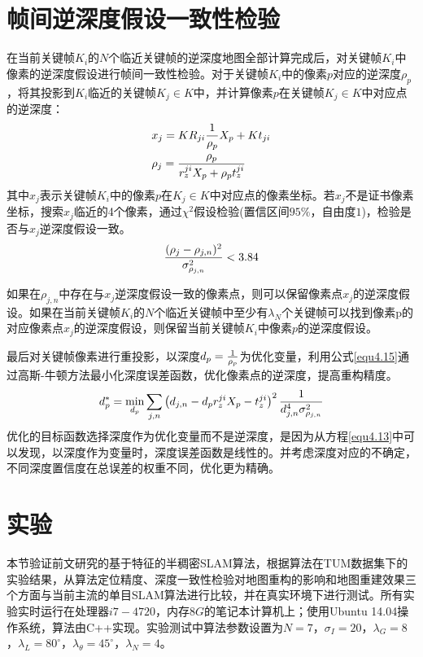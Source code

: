 \section{帧间逆深度假设一致性检验}
在当前关键帧$K_i$的$N$个临近关键帧的逆深度地图全部计算完成后，对关键帧$K_i$中像素的逆深度假设进行帧间一致性检验。对于关键帧$K_i$中的像素$p$对应的逆深度$\rho_p$，将其投影到$K_i$临近的关键帧$K_j \in K$中，并计算像素$p$在关键帧$K_j \in K$中对应点的逆深度：
\begin{equation}
\label{equ4.13}
\begin{aligned}
& x_j = K R_{ji} {1 \over \rho_p} X_p + Kt_{ji} \\ 
& \rho_j = { \rho_p \over r_z^{ji}X_p+\rho_p t_z^{ji} }
\end{aligned}
\end{equation}
其中$x_{j}$表示关键帧$K_i$中的像素$p$在$K_j \in K$中对应点的像素坐标。若$x_j$不是证书像素坐标，搜索$x_{j}$临近的4个像素，通过$\chi^2$假设检验(置信区间$95\%$，自由度$1$)，检验是否与$x_j$逆深度假设一致。
\begin{equation}
\label{equ4.14}
{ (\rho_j - \rho_{j,n})^2 \over \sigma_{\rho_{j,n}}^2 } < 3.84
\end{equation}

如果在$\rho_{j,n}$中存在与$x_j$逆深度假设一致的像素点，则可以保留像素点$x_j$的逆深度假设。如果在当前关键帧$K_i$的$N$个临近关键帧中至少有$\lambda_N$个关键帧可以找到像素p的对应像素点$x_j$的逆深度假设，则保留当前关键帧$K_i$中像素$p$的逆深度假设。

最后对关键帧像素进行重投影，以深度$d_p = { 1 \over \rho_p }$为优化变量，利用公式\eqref{equ4.15}通过高斯-牛顿方法最小化深度误差函数，优化像素点的逆深度，提高重构精度。
\begin{equation}
\label{equ4.15}
d_p^* = \min_{d_p} \sum\limits_{j,n} \left( d_{j,n} - d_p r_z^{ji} X_p - t_z^{ji}  \right)^2  {1 \over {d_{j,n}^4 \sigma_{\rho_{j,n}}^2 }}
\end{equation}
优化的目标函数选择深度作为优化变量而不是逆深度，是因为从方程\eqref{equ4.13}中可以发现，以深度作为变量时，深度误差函数是线性的。并考虑深度对应的不确定，不同深度置信度在总误差的权重不同，优化更为精确。


\section{实验}
本节验证前文研究的基于特征的半稠密SLAM算法，根据算法在TUM数据集下的实验结果，从算法定位精度、深度一致性检验对地图重构的影响和地图重建效果三个方面与当前主流的单目SLAM算法进行比较，并在真实环境下进行测试。所有实验实时运行在处理器$i7-4720$，内存$8G$的笔记本计算机上；使用Ubuntu 14.04操作系统，算法由C++实现。实验测试中算法参数设置为$N=7$，$\sigma_I=20$，$\lambda_G=8$，$\lambda_L = 80^\circ$，$\lambda_\theta=45^\circ$，$\lambda_N=4$。

